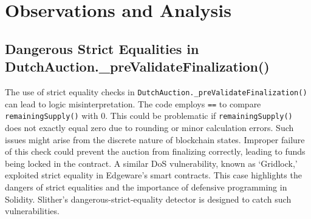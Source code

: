 \documentclass[conference]{IEEEtran}
\begin{document}
\section{Observations and Analysis}


\subsection{Dangerous Strict Equalities in DutchAuction.\_preValidateFinalization()}
The use of strict equality checks in \texttt{DutchAuction.\_preValidateFinalization()} can lead to logic misinterpretation. The code employs \texttt{==} to compare \texttt{remainingSupply()} with 0. This could be problematic if \texttt{remainingSupply()} does not exactly equal zero due to rounding or minor calculation errors. Such issues might arise from the discrete nature of blockchain states. Improper failure of this check could prevent the auction from finalizing correctly, leading to funds being locked in the contract. A similar DoS vulnerability, known as ‘Gridlock,’ exploited strict equality in Edgeware's smart contracts. This case highlights the dangers of strict equalities and the importance of defensive programming in Solidity. Slither’s dangerous-strict-equality detector is designed to catch such vulnerabilities\cite{trailofbits2019gridlock}.
\end{document}
